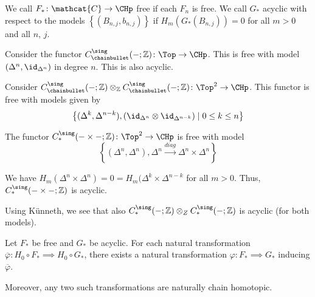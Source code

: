 \begin{definition}
  We call $F_* \colon  \mathcat{C} \to  \CHp$ free if each $F_n$ is free.
  We call  $G_*$ acyclic with respect to the models
   $\left\{(B_{n,j}, b_{n,j})\right\} $ 
   if $H_m(G_*(B_{n,j})) = 0$ for all $m>0$ and all $n$,  $j$.
\end{definition}

\begin{example}
  Consider the functor
  $C_\chainbullet ^{\sing}(\blank ; \mathbb{Z})\colon \Top \to \CHp$.
  This is free with model $(\Delta^n, \id_{\Delta^n})$ in degree $n$.
  This is also acyclic.
\end{example}

\begin{example}
  Consider
  $C_\chainbullet ^{\sing}(\blank ; \mathbb{Z}) \otimes _{\mathbb{Z}} C_\chainbullet ^{\sing}
  (\blank ; \mathbb{Z}) \colon  \Top^2 \to  \CHp$.
  This functor is free with models given by
  \[
    \left\{(\Delta^k, \Delta^{n-k}), (\id_{\Delta^n} \otimes \id_{\Delta^{n-k}}) 
    \mid  0 \leq  k \leq  n\right\} 
  \]

  The functor $C_*^{\sing}(\blank \times  \blank ; \mathbb{Z}) \colon  \Top^2\to \CHp$
  is free with model
  \[
    \left\{(\Delta^n, \Delta^n), \Delta^n \xrightarrow{diag} \Delta^n \times \Delta^n \right\} 
  \]

  We have $H_m(\Delta^n \times \Delta^n) = 0 = H_m(\Delta^k \times \Delta^{n-k}$ 
  for all $m>0$.
  Thus,  $C_*^{\sing}(- \times - ; \mathbb{Z})$ is acyclic.

  Using Künneth, we see that also
  $C_*^{\sing}( \blank ; \mathbb{Z}) \otimes _Z C_*^{\sing} (\blank ; \mathbb{Z})$ 
  is acyclic (for both models).
\end{example}

\begin{theorem}
  Let $F_*$ be free and  $G_*$ be acyclic.
  For each natural transformation
  $\overline{\varphi } \colon  H_0 \circ  F_*
  \implies H_0 \circ  G_*$,
  there exists a natural transformation $\varphi \colon F_* \implies G_*$
  inducing $\overline{\varphi }$.

  Moreover, any two such transformations are naturally chain homotopic.
\end{theorem}


